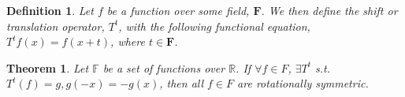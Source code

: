 \documentclass{article}
\newtheorem{definition}{Definition}
\newtheorem{theorem}{Theorem}
\begin{document}
\begin{definition}\label{shiftdef}
  Let $f$ be a function over some field, $\mathbf{F}$. We then define the shift or
  translation operator, $T^t$, with the following functional equation,
  $T^t f(x) = f(x+t)$, where $t \in \mathbf{F}$.
\end{definition}

\begin{theorem}
  Let $\mathbb{F}$ be a set of functions over $\mathbb{R}$. If $\forall f\in F$, $\exists T^t$
  s.t. $T^t(f) = g, g(-x) = -g(x)$, then all $f \in F$ are rotationally symmetric.
\end{theorem}
\end{document}
